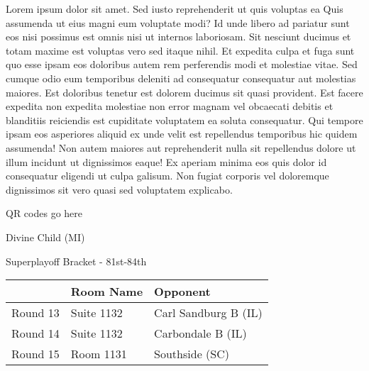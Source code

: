 \documentclass{article}%
\begin{document}
\vspace*{8pt}%
\linebreak%
\newline%
\newline%
Lorem ipsum dolor sit amet. Sed iusto reprehenderit ut quis voluptas ea Quis assumenda ut eius magni eum voluptate modi? Id unde libero ad pariatur sunt eos nisi possimus est omnis nisi ut internos laboriosam. Sit nesciunt ducimus et totam maxime est voluptas vero sed itaque nihil. Et expedita culpa et fuga sunt quo esse ipsam eos doloribus autem rem perferendis modi et molestiae vitae.\newline%
\newline%
Sed cumque odio eum temporibus deleniti ad consequatur consequatur aut molestias maiores. Est doloribus tenetur est dolorem ducimus sit quasi provident. Est facere expedita non expedita molestiae non error magnam vel obcaecati debitis et blanditiis reiciendis est cupiditate voluptatem ea soluta consequatur. Qui tempore ipsam eos asperiores aliquid ex unde velit est repellendus temporibus hic quidem assumenda!\newline%
\newline%
Non autem maiores aut reprehenderit nulla sit repellendus dolore ut illum incidunt ut dignissimos eaque! Ex aperiam minima eos quis dolor id consequatur eligendi ut culpa galisum. Non fugiat corporis vel doloremque dignissimos sit vero quasi sed voluptatem explicabo.\newline%
\newline%
%
\vspace*{30pt}%
\begin{center}%
\begin{Huge}%
QR codes go here%
\end{Huge}%
\end{center}%
\newpage%
\begin{center}%
\begin{Huge}%
Divine Child (MI)%
\end{Huge}%
\vspace*{8pt}%
\linebreak%
\begin{Large}%
Superplayoff Bracket {-} 81st{-}84th%
\end{Large}%
\end{center}%
%
\begin{tabularx}{\textwidth}{|c|Y|Y|}%
\hline%
&Room Name&Opponent\\%
\hline%
Round 13&Suite 1132&Carl Sandburg B (IL)\\%
Round 14&Suite 1132&Carbondale B (IL)\\%
Round 15&Room 1131&Southside (SC)\\%
\hline%
\end{tabularx}%
\end{document}

